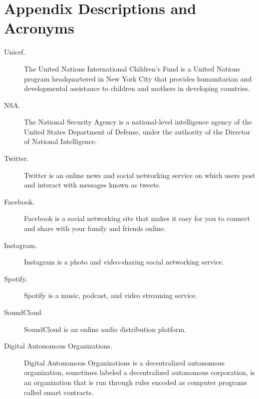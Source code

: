\section{Appendix Descriptions and Acronyms}
\begin{description}
\item[Unicef.] The United Nations International Children's Fund is a
  United Nations program headquartered in New York City that provides
  humanitarian and developmental assistance to children and mothers in
  developing countries.

\item[NSA.] The National Security Agency is a national-level
  intelligence agency of the United States Department of Defense,
  under the authority of the Director of National Intelligence.

\item[Twitter.] Twitter is an online news and social networking
  service on which users post and interact with messages known as
  tweets.

\item[Facebook.] Facebook is a social networking site that
  makes it easy for you to connect and share with your family and
  friends online.

\item[Instagram.] Instagram is a photo and
  video-sharing social networking service.

\item[Spotify.] Spotify is
  a music, podcast, and video streaming service.

\item[SoundCloud] SoundCloud is an online audio distribution
  platform.


\item [Digital Autonomous Organizations.] Digital Autonomous
  Organizations is a decentralized autonomous organization,
  sometimes labeled a decentralized autonomous corporation, is an
  organization that is run through rules encoded as computer programs
  called smart contracts.
\end{description}





